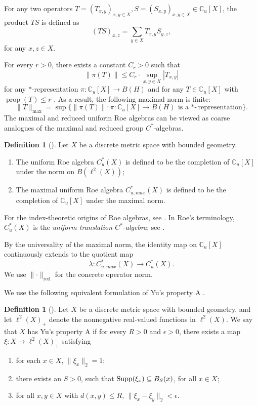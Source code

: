 \documentclass[11pt,a4paper]{article}
\theoremstyle{definition}\newtheorem{definition}[theorem]{Definition}
\theoremstyle{remark}\newtheorem{remark}[theorem]{Remark}
\newcommand{\norm}[1]{\lVert#1\rVert}
\DeclareMathOperator{\prop}{prop}
\begin{document}
For any two operators $T=(T_{x,y})_{x,y\in X}, S=(S_{x,y})_{x,y\in X}\in \mathbb{C}_u[X]$, the product $TS$ is defined as 
$$(TS)_{x,z}=\sum_{y\in X}T_{x,y}S_{y,z},$$
for any $x,z \in X$.

For every $r>0$, there exists a constant $C_r>0$ such that 
$$\|\pi(T)\|\leq C_r \cdot \sup_{x,y\in X} |T_{x,y}|$$
for any $*$-representation $\pi: \mathbb{C}_u[X]\to B(H)$ and
for any $T\in \mathbb{C}_u[X]$ with $\prop(T)\leq r$ \cite[Lemma 1.10]{SW}. As a result, the following maximal norm is finite: 
$$
\|T\|_{\max}=\sup \{\|\pi(T)\|: \pi: \mathbb{C}_u[X]\to B(H)~\mbox{is a $*$-}\mbox{representation}\}.
$$
The maximal and reduced uniform Roe algebras can be viewed as coarse
analogues of the maximal and reduced group $C^*$-algebras.
\begin{definition}[{\cite[Definitions 1.9 and 1.11]{SW}}]
Let $X$ be a discrete metric space with bounded geometry.
    \begin{enumerate}
        \item[(1)] The uniform Roe algebra $C_u^*(X)$ is defined to be the completion of $\mathbb{C}_u[X]$ under the norm on $B(\ell^2(X))$;
        \item[(2)] The maximal uniform Roe algebra $C^*_{u,max}(X)$ is defined to be the completion of $\mathbb{C}_u[X]$ under the maximal norm.
    \end{enumerate}
\end{definition}

For the index-theoretic origins of Roe algebras, see \cite{Roe88}.
In Roe's terminology, $C_u^*(X)$ is the
\emph{uniform translation $C^*$-algebra};
see \cite[Section 4.4]{Roe03}.

By the universality of the maximal norm, the identity map on $\mathbb{C}_u[X]$ continuously extends to the quotient map 
$$
\lambda: C^*_{u,max}(X)\to C^*_{u}(X).
$$
We use $\norm{\cdot}_{\mathrm{red}}$ for the concrete operator norm.

We use the following equivalent formulation of Yu's property A \cite{Yu}.
\begin{definition}[{\cite[Definition 2.1]{SW}}]\label{def:property-a}
    Let $X$ be a discrete metric space with bounded geometry, and let $\ell^2(X)_+$ denote the nonnegative real-valued functions in $\ell^2(X)$. We say that $X$ has Yu's property A if for every $R>0$ and $\epsilon>0$, there exists a map $\xi: X\to \ell^2(X)_+$ satisfying
    \begin{enumerate}
        \item[(1)] for each $x\in X$, $\|\xi_x\|_2=1$;
        \item[(2)] there exists an $S>0$, such that ${\rm Supp}(\xi_x)\subseteq B_S(x)$, for all $x\in X$;
        \item[(3)] for all $x, y\in X$ with $d(x,y)\leq R$, $\|\xi_x-\xi_y\|_2<\epsilon$.
    \end{enumerate}
\end{definition}
\end{document}
